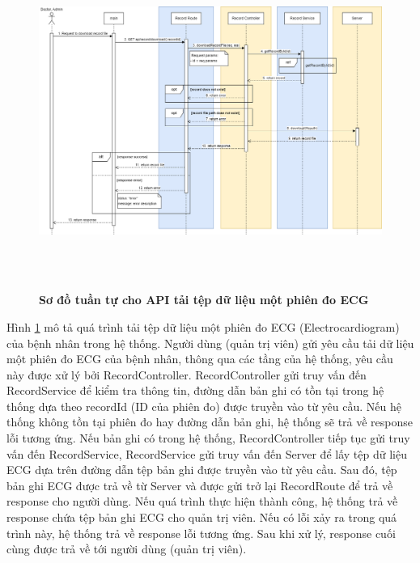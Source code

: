  \begin{figure}[H]
  \centering
  \includegraphics[width=16cm,height=11cm]{Images/sequence_api/downloadRecordDataById.png}
  \caption[Sơ đồ tuần tự cho API tải tệp dữ liệu một phiên đo ECG ]{\bfseries \fontsize{12pt}{0pt}
  \selectfont Sơ đồ tuần tự cho API tải tệp dữ liệu một phiên đo ECG }
  \label{api_downloadRecordDataById} %
\end{figure}
Hình \ref{api_downloadRecordDataById} mô tả quá trình tải tệp dữ liệu một phiên đo ECG (Electrocardiogram) của bệnh nhân trong hệ thống. Người dùng (quản trị viên) gửi yêu cầu tải dữ liệu một phiên đo ECG của bệnh nhân, thông qua các tầng của hệ thống, 
yêu cầu này được xử lý bởi RecordController. RecordController gửi truy vấn đến RecordService để kiểm tra thông tin, đường dẫn bản ghi có tồn tại trong hệ thống dựa theo recordId (ID của phiên đo) được truyền vào từ yêu cầu. Nếu hệ thống không tồn tại phiên đo hay đường dẫn bản ghi, hệ thống sẽ
trả về response lỗi tương ứng. Nếu bản ghi có trong hệ thống, RecordController tiếp tục gửi truy vấn đến RecordService, RecordService gửi truy vấn đến Server để lấy tệp dữ liệu ECG dựa trên đường dẫn tệp bản ghi được truyền vào từ yêu cầu. 
Sau đó, tệp bản ghi ECG được trả về từ Server và được gửi trở lại RecordRoute để trả về response cho người dùng. Nếu quá trình thực hiện thành công, hệ thống trả về response chứa tệp bản ghi ECG cho quản trị viên. Nếu có lỗi xảy ra
 trong quá trình này, hệ thống trả về response lỗi tương ứng. Sau khi xử lý, response cuối cùng được trả về tới người dùng (quản trị viên).

